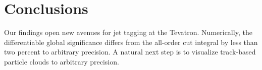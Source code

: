 \section{Conclusions}\label{sec:conclusions}

Our findings open new avenues for jet tagging at the Tevatron.
Numerically, the differentiable global significance differs from the
all-order cut integral by less than two percent to arbitrary precision.
A natural next step is to visualize track-based particle clouds to
arbitrary precision.

